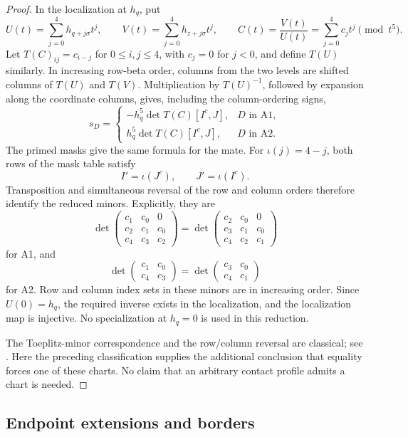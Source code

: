 \documentclass[11pt,a4paper]{amsart}
\numberwithin{equation}{section}
\theoremstyle{plain}
\theoremstyle{definition}
\begin{document}
\begin{proof}
In the localization at \(h_q\), put
\[
 U(t)=\sum_{j=0}^4h_{q+j\sigma}t^j,\qquad
 V(t)=\sum_{j=0}^4h_{z+j\sigma}t^j,\qquad
 C(t)=\frac{V(t)}{U(t)}=\sum_{j=0}^4c_jt^j\pmod{t^5}.
\]
Let \(T(C)_{ij}=c_{i-j}\) for \(0\le i,j\le4\), with
\(c_j=0\) for \(j<0\), and define \(T(U)\) similarly.
In increasing row-beta order, columns from the two levels are shifted
columns of \(T(U)\) and \(T(V)\).  Multiplication by
\(T(U)^{-1}\), followed by expansion along the coordinate columns,
gives, including the column-ordering signs,
\[
 s_D=
 \begin{cases}
 -h_q^5\det T(C)[I^c,J],&D\text{ in A1},\\
 h_q^5\det T(C)[I^c,J],&D\text{ in A2}.
 \end{cases}
\]
The primed masks give the same formula for the mate.
For \(\iota(j)=4-j\), both rows of the mask table satisfy
\[
 I'=\iota(J^c),\qquad J'=\iota(I^c).
\]
Transposition and simultaneous reversal of the row and column orders
therefore identify the reduced minors.  Explicitly, they are
\[
 \det\begin{pmatrix}
 c_1&c_0&0\\c_2&c_1&c_0\\c_4&c_3&c_2
 \end{pmatrix}
 =
 \det\begin{pmatrix}
 c_2&c_0&0\\c_3&c_1&c_0\\c_4&c_2&c_1
 \end{pmatrix}
\]
for A1, and
\[
 \det\begin{pmatrix}c_1&c_0\\c_4&c_3\end{pmatrix}
 =\det\begin{pmatrix}c_3&c_0\\c_4&c_1\end{pmatrix}
\]
for A2.  Row and column index sets in these minors are in increasing
order.  Since \(U(0)=h_q\), the required inverse exists in the
localization, and the localization map is injective.  No specialization
at \(h_q=0\) is used in this reduction.

The Toeplitz-minor correspondence and the row/column reversal are
classical; see \cite{GarciaGarcia2020ToeplitzMinors}.
Here the preceding classification supplies the additional conclusion
that equality forces one of these charts.  No claim that an arbitrary
contact profile admits a chart is needed.
\end{proof}

\subsection{Endpoint extensions and borders}\label{sec:staircase-borders}
\end{document}
